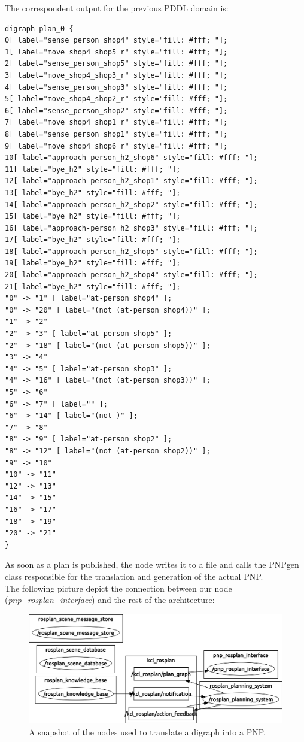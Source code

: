 \documentclass[pdftex,12pt,a4paper]{report}
\begin{document}
The correspondent output for the previous PDDL domain is:

\begin{verbatim}
digraph plan_0 {
0[ label="sense_person_shop4" style="fill: #fff; "];
1[ label="move_shop4_shop5_r" style="fill: #fff; "];
2[ label="sense_person_shop5" style="fill: #fff; "];
3[ label="move_shop4_shop3_r" style="fill: #fff; "];
4[ label="sense_person_shop3" style="fill: #fff; "];
5[ label="move_shop4_shop2_r" style="fill: #fff; "];
6[ label="sense_person_shop2" style="fill: #fff; "];
7[ label="move_shop4_shop1_r" style="fill: #fff; "];
8[ label="sense_person_shop1" style="fill: #fff; "];
9[ label="move_shop4_shop6_r" style="fill: #fff; "];
10[ label="approach-person_h2_shop6" style="fill: #fff; "];
11[ label="bye_h2" style="fill: #fff; "];
12[ label="approach-person_h2_shop1" style="fill: #fff; "];
13[ label="bye_h2" style="fill: #fff; "];
14[ label="approach-person_h2_shop2" style="fill: #fff; "];
15[ label="bye_h2" style="fill: #fff; "];
16[ label="approach-person_h2_shop3" style="fill: #fff; "];
17[ label="bye_h2" style="fill: #fff; "];
18[ label="approach-person_h2_shop5" style="fill: #fff; "];
19[ label="bye_h2" style="fill: #fff; "];
20[ label="approach-person_h2_shop4" style="fill: #fff; "];
21[ label="bye_h2" style="fill: #fff; "];
"0" -> "1" [ label="at-person shop4" ];
"0" -> "20" [ label="(not (at-person shop4))" ];
"1" -> "2"
"2" -> "3" [ label="at-person shop5" ];
"2" -> "18" [ label="(not (at-person shop5))" ];
"3" -> "4"
"4" -> "5" [ label="at-person shop3" ];
"4" -> "16" [ label="(not (at-person shop3))" ];
"5" -> "6"
"6" -> "7" [ label="" ];
"6" -> "14" [ label="(not )" ];
"7" -> "8"
"8" -> "9" [ label="at-person shop2" ];
"8" -> "12" [ label="(not (at-person shop2))" ];
"9" -> "10"
"10" -> "11"
"12" -> "13"
"14" -> "15"
"16" -> "17"
"18" -> "19"
"20" -> "21"
}
\end{verbatim}

\noindent As soon as a plan is published, the node writes it to a file and calls the PNPgen class responsible for the translation and generation of the actual PNP.\\ 
The following picture depict the connection between our node (\textit{pnp\_rosplan\_interface}) and the rest of the architecture:

\begin{figure}[htbp]
	\centering
	\includegraphics[scale=0.3]{images/rospnp.png}
	\caption{A snapshot of the nodes used to translate a digraph into a PNP.}
\end{figure}
\end{document}
